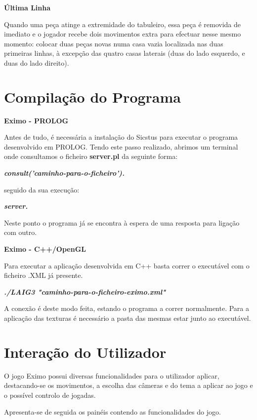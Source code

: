 \documentclass[a4paper]{article}
\begin{document}
\large{\textbf{Última Linha}}
\begin{small}

Quando uma peça atinge a extremidade do tabuleiro, essa peça é removida de imediato e o jogador recebe dois movimentos extra para efectuar nesse mesmo momento: colocar duas peças novas numa casa vazia localizada nas duas primeiras linhas, à excepção das quatro casas laterais (duas do lado esquerdo, e duas do lado direito).
\end{small}\newline


\section{Compilação do Programa}
\large{\textbf{Eximo - PROLOG}}

\begin{small}
Antes de tudo, é necessária a instalação do Sicstus para executar o programa desenvolvido em PROLOG. Tendo este passo realizado, abrimos um terminal onde consultamos o ficheiro \textbf{server.pl} da seguinte forma:

\textbf{\textit{consult('caminho-para-o-ficheiro').}}

seguido da sua execução:

\textbf{\textit{server.}}

Neste ponto o programa já se encontra à espera de uma resposta para ligação com outro.

\hfill
\end{small}

\large{\textbf{Eximo - C++/OpenGL}}

\begin{small}
Para executar a aplicação desenvolvida em C++ basta correr o executável com o ficheiro .XML já presente.

\textbf{\textit{./LAIG3 "caminho-para-o-ficheiro-eximo.xml"}}

A conexão é deste modo feita, estando o programa a correr normalmente. Para a aplicação das texturas é necessário a pasta das mesmas estar junto ao executável.
\end{small}

\section{Interação do Utilizador}

\begin{small}
O jogo Eximo possui diversas funcionalidades para o utilizador aplicar, destacando-se os movimentos, a escolha das câmeras e do tema a aplicar ao jogo e o possível controlo de jogadas.

Apresenta-se de seguida os painéis contendo as funcionalidades do jogo.
\end{small}
\end{document}
